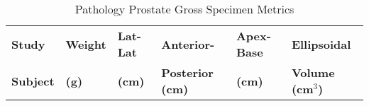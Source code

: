 \begin{table}
\centering
\caption{Pathology Prostate Gross Specimen Metrics}
\begin{tabular}{|l|l|l|l|l|l|} \hline
{\bf Study } & {\bf Weight} & {\bf Lat-Lat} & {\bf Anterior-} & {\bf Apex-Base} & {\bf Ellipsoidal} \\
{\bf Subject} & {\bf (g)} & {\bf (cm)} & {\bf Posterior (cm)} & {\bf (cm)} & {\bf Volume (cm$^3$)} \\ \hline

\hline
\end{tabular}
\label{tab:path_data}
\end{table}
